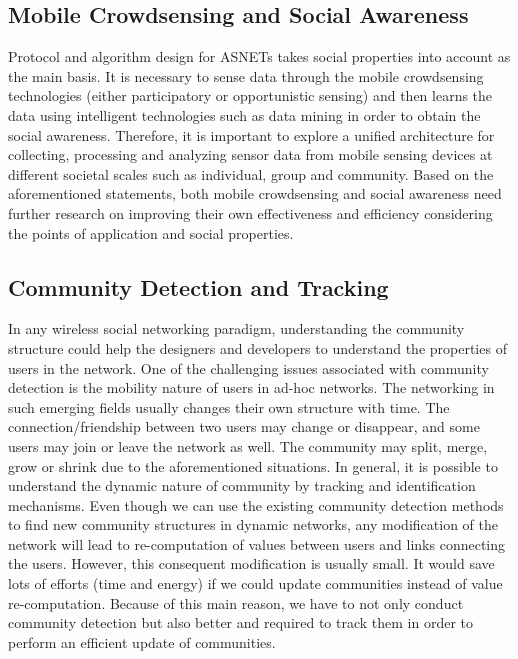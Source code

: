 \subsection{Mobile Crowdsensing and Social Awareness}\label{Chap2_07_01}
Protocol and algorithm design for ASNETs takes social properties into account as the main basis. It is necessary to sense data through the mobile crowdsensing technologies (either participatory or opportunistic sensing) and then learns the data using intelligent technologies such as data mining in order to obtain the social awareness. Therefore, it is important to explore a unified architecture for collecting, processing and analyzing sensor data from mobile sensing devices at different societal scales such as individual, group and community. Based on the aforementioned statements, both mobile crowdsensing and social awareness need further research on improving their own effectiveness and efficiency considering the points of application and social properties.

\subsection{Community Detection and Tracking}\label{Chap2_07_02}
In any wireless social networking paradigm, understanding the community structure could help the designers and developers to understand the properties of users in the network. One of the challenging issues associated with community detection is the mobility nature of users in ad-hoc networks. The networking in such emerging fields usually changes their own structure with time. The connection/friendship between two users may change or disappear, and some users may join or leave the network as well. The community may split, merge, grow or shrink due to the aforementioned situations. In general, it is possible to understand the dynamic nature of community by tracking and identification mechanisms. Even though we can use the existing community detection methods to find new community structures in dynamic networks, any modification of the network will lead to re-computation of values between users and links connecting the users. However, this consequent modification is usually small. It would save lots of efforts (time and energy) if we could update communities instead of value re-computation. Because of this main reason, we have to not only conduct community detection but also better and required to track them in order to perform an efficient update of communities.

